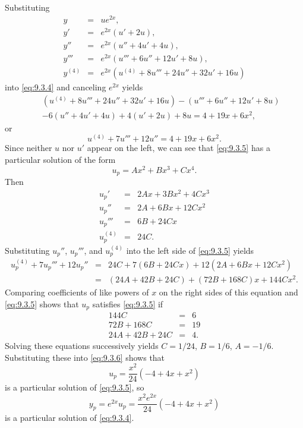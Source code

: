 \documentclass{ximera}
\begin{document}
\begin{example}
\begin{explanation}
Substituting
\begin{eqnarray*}
y&=&ue^{2x},\\ y'&=&e^{2x}(u'+2u),\\
y''&=&e^{2x}(u''+4u'+4u),\\
y'''&=&e^{2x}(u'''+6u''+12u'+8u),\\
y^{(4)}&=&e^{2x}(u^{(4)}+8u'''+24u''+32u'+16u)
\end{eqnarray*}
into \eqref{eq:9.3.4} and canceling $e^{2x}$ yields
\begin{eqnarray*}
&&(u^{(4)}+8u'''+24u''+32u'+16u)-(u'''+6u''+12u'+8u)\\
&&-6(u''+4u'+4u)+4(u'+2u)+8u=4+19x+6x^2,
\end{eqnarray*}
or
\begin{equation} \label{eq:9.3.5}
u^{(4)}+7u'''+12u''=4+19x+6x^2.
\end{equation}
Since neither $u$ nor $u'$ appear on the left, we can see that
\eqref{eq:9.3.5} has a particular solution of the form
\begin{equation} \label{eq:9.3.6}
u_p=Ax^2+Bx^3+Cx^4.
\end{equation}
Then
\begin{eqnarray*}
u_p'&=&2Ax+3Bx^2+4Cx^3\\
u_p''&=&2A+6Bx+12Cx^2\\
u_p'''&=&6B+24Cx\\
u_p^{(4)}&=&24C.
\end{eqnarray*}
Substituting $u_p''$, $u_p'''$, and $u_p^{(4)}$  into the left side of
\eqref{eq:9.3.5} yields
\begin{eqnarray*}
u_p^{(4)}+7u_p'''+12u_p''&=&24C+7(6B+24Cx)+12(2A+6Bx+12Cx^2)\\
&=&(24A+42B+24C)+(72B+168C)x+144Cx^2.
\end{eqnarray*}
Comparing coefficients of like powers of $x$ on the right sides of
this equation and \eqref{eq:9.3.5} shows that $u_p$ satisfies \eqref{eq:9.3.5}
if
$$
\begin{array}{rcr}
144C&=&6\\
72B+168C&=&19\\
24A+42B+24C&=&4.
\end{array}
$$
Solving these equations successively yields $C=1/24$, $B=1/6$, $A=-1/6$.
Substituting these into \eqref{eq:9.3.6} shows that
$$
u_p=\frac{x^2}{24}(-4+4x+x^2)
$$
is a particular solution of  \eqref{eq:9.3.5}, so
$$
y_p=e^{2x}u_p=\frac{x^2e^{2x}}{24}(-4+4x+x^2)
$$
is a particular solution of  \eqref{eq:9.3.4}.



\end{explanation}
\end{example}
\end{document}
